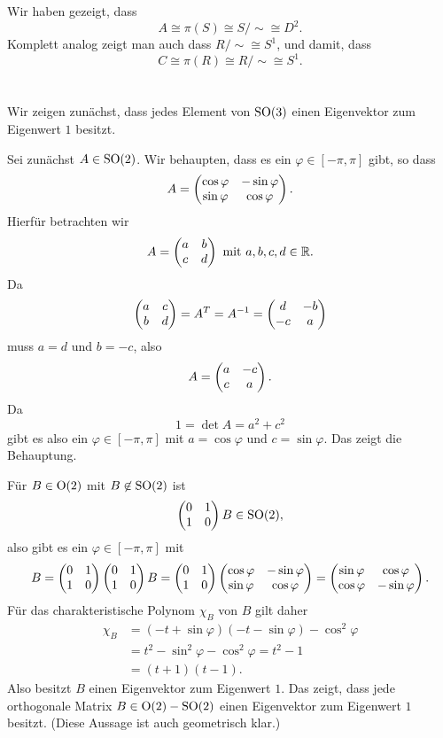 \documentclass[a4paper,10pt]{article}
\begin{document}
Wir haben gezeigt, dass
\[
 A \cong \pi(S) \cong S/{\sim} \cong D^2.
\]
Komplett analog zeigt man auch dass $R/{\sim} \cong S^1$, und damit, dass
\[
 C \cong \pi(R) \cong R/{\sim} \cong S^1.
\]


\section{}


\subsection{}
Wir zeigen zunächst, dass jedes Element von $\operatorname{SO}(3)$ einen Eigenvektor zum Eigenwert $1$ besitzt.

Sei zunächst $A \in \operatorname{SO}(2)$. Wir behaupten, dass es ein $\varphi \in [-\pi,\pi]$ gibt, so dass
\[
 A = \begin{pmatrix}\cos \varphi & -\sin \varphi \\ \sin \varphi & \cos \varphi\end{pmatrix}.
\]
Hierfür betrachten wir
\[
 A = \begin{pmatrix}a & b \\ c & d\end{pmatrix} \text{ mit } a,b,c,d \in \mathbb{R}.
\]
Da
\[
 \begin{pmatrix}a & c \\ b & d\end{pmatrix} = A^T = A^{-1} = \begin{pmatrix}d & -b \\ -c & a\end{pmatrix}
\]
muss $a = d$ und $b = -c$, also
\[
 A= \begin{pmatrix}a & -c \\ c & a\end{pmatrix}.
\]
Da
\[
 1 = \det A = a^2 + c^2
\]
gibt es also ein $\varphi \in [-\pi,\pi]$ mit $a = \cos \varphi$ und $c = \sin \varphi$. Das zeigt die Behauptung.

Für $B \in \operatorname{O}(2)$ mit $B \not\in \operatorname{SO}(2)$ ist
\[
 \begin{pmatrix}0 & 1 \\ 1 & 0\end{pmatrix} B \in \operatorname{SO}(2),
\]
also gibt es ein $\varphi \in [-\pi,\pi]$ mit
\[
 B
 = \begin{pmatrix}0 & 1 \\ 1 & 0\end{pmatrix} \begin{pmatrix}0 & 1 \\ 1 & 0\end{pmatrix} B
 = \begin{pmatrix}0 & 1 \\ 1 & 0\end{pmatrix} \begin{pmatrix}\cos \varphi & -\sin \varphi \\ \sin \varphi & \cos \varphi\end{pmatrix}
 = \begin{pmatrix}\sin \varphi & \cos \varphi \\ \cos \varphi & -\sin \varphi\end{pmatrix}.
\]
Für das charakteristische Polynom $\chi_B$ von $B$ gilt daher
\begin{align*}
 \chi_B
 &= (-t+\sin \varphi)(-t-\sin \varphi)-\cos^2 \varphi \\
 &= t^2 - \sin^2 \varphi - \cos^2 \varphi
 = t^2 - 1 \\
 &= (t+1)(t-1).
\end{align*}
Also besitzt $B$ einen Eigenvektor zum Eigenwert $1$. Das zeigt, dass jede orthogonale Matrix $B \in \operatorname{O}(2) - \operatorname{SO}(2)$ einen Eigenvektor zum Eigenwert $1$ besitzt. (Diese Aussage ist auch geometrisch klar.)
\end{document}

